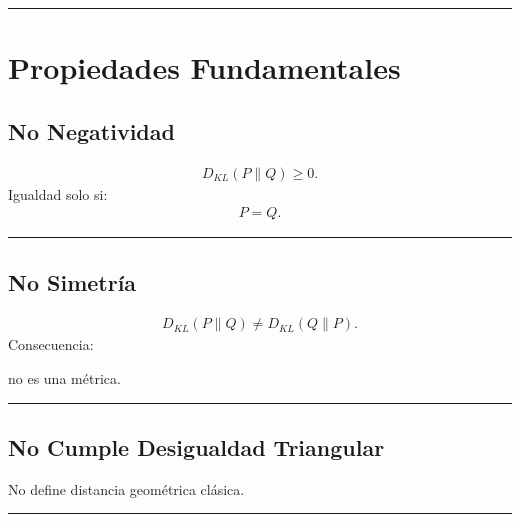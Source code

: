 \documentclass[letterpaper,10pt,english]{jupyterBook}
\begin{document}
\bigskip\hrule\bigskip



\section{Propiedades Fundamentales}
\label{\detokenize{02_mathematical_foundations/kl_divergence:propiedades-fundamentales}}

\subsection{No Negatividad}
\label{\detokenize{02_mathematical_foundations/kl_divergence:no-negatividad}}\begin{equation*}
\begin{split}
D_{KL}(P\|Q)\ge 0.
\end{split}
\end{equation*}
\sphinxAtStartPar
Igualdad solo si:
\begin{equation*}
\begin{split}
P=Q.
\end{split}
\end{equation*}

\bigskip\hrule\bigskip



\subsection{No Simetría}
\label{\detokenize{02_mathematical_foundations/kl_divergence:no-simetria}}\begin{equation*}
\begin{split}
D_{KL}(P\|Q)\neq D_{KL}(Q\|P).
\end{split}
\end{equation*}
\sphinxAtStartPar
Consecuencia:

\sphinxAtStartPar
no es una métrica.


\bigskip\hrule\bigskip



\subsection{No Cumple Desigualdad Triangular}
\label{\detokenize{02_mathematical_foundations/kl_divergence:no-cumple-desigualdad-triangular}}
\sphinxAtStartPar
No define distancia geométrica clásica.


\bigskip\hrule\bigskip
\end{document}
